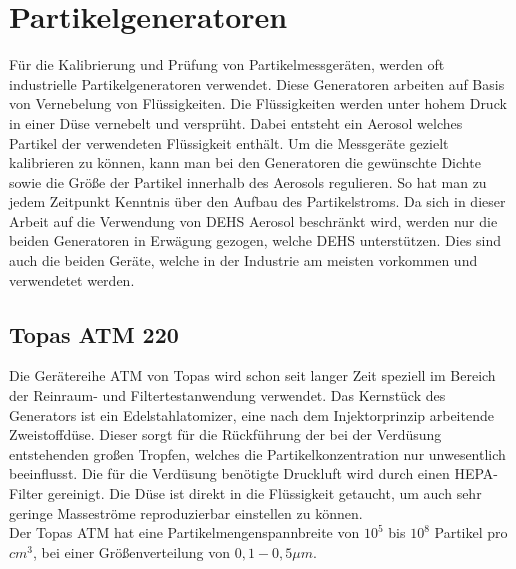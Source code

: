\section{Partikelgeneratoren}
F\"{u}r die Kalibrierung und Pr\"{u}fung von Partikelmessger\"{a}ten, werden oft industrielle Partikelgeneratoren verwendet. Diese Generatoren arbeiten auf Basis von Vernebelung von Fl\"{u}ssigkeiten. Die Fl\"{u}ssigkeiten werden unter hohem Druck in einer D\"{u}se vernebelt und verspr\"{u}ht. Dabei entsteht ein Aerosol welches Partikel der verwendeten Fl\"{u}ssigkeit enth\"{a}lt. Um die Messger\"{a}te gezielt kalibrieren zu k\"{o}nnen, kann man bei den Generatoren die gew\"{u}nschte Dichte sowie die Gr\"{o}{\ss}e der Partikel innerhalb des Aerosols regulieren. So hat man zu jedem Zeitpunkt Kenntnis \"{u}ber den Aufbau des Partikelstroms. Da sich in dieser Arbeit auf die Verwendung von DEHS Aerosol beschr\"{a}nkt wird, werden nur die beiden Generatoren in Erw\"{a}gung gezogen, welche DEHS unterst\"{u}tzen. Dies sind auch die beiden Ger\"{a}te, welche in der Industrie am meisten vorkommen und verwendetet werden.

\subsection{Topas ATM 220}
Die Ger\"{a}tereihe ATM von Topas wird schon seit langer Zeit speziell im Bereich der Reinraum- und Filtertestanwendung verwendet. Das Kernst\"{u}ck des Generators ist ein Edelstahlatomizer, eine nach dem Injektorprinzip arbeitende Zweistoffd\"{u}se. Dieser sorgt f\"{u}r die R\"{u}ckf\"{u}hrung der bei der Verd\"{u}sung entstehenden gro{\ss}en Tropfen, welches die Partikelkonzentration nur unwesentlich beeinflusst. Die f\"{u}r die Verd\"{u}sung ben\"{o}tigte Druckluft wird durch einen HEPA-Filter gereinigt. Die D\"{u}se ist direkt in die Fl\"{u}ssigkeit getaucht, um auch sehr geringe Massestr\"{o}me reproduzierbar einstellen zu k\"{o}nnen.\\
Der Topas ATM hat eine Partikelmengenspannbreite  von \(10^5\) bis \(10^8\) Partikel pro \(cm^3\), bei einer Gr\"{o}{\ss}enverteilung von \(0,1 - 0,5 \mu m\).\cite{topas}

